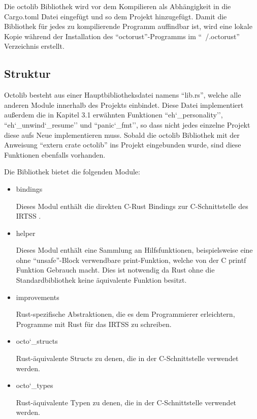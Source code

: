 Die octolib Bibliothek wird vor dem Kompilieren als Abhängigkeit in die Cargo.toml Datei eingefügt und so dem Projekt hinzugefügt.
Damit die Bibliothek für jedes zu kompilierende Programm auffindbar ist, wird eine lokale Kopie während der Installation des
``octorust''-Programms im ``~/.octorust'' Verzeichnis erstellt.

\subsection{Struktur}

Octolib besteht aus einer Hauptbibliotheksdatei namens ``lib.rs'', welche alle anderen Module innerhalb des Projekts einbindet. Diese
Datei implementiert außerdem die in Kapitel 3.1 erwähnten Funktionen ``eh\char`_personality'', ``eh\char`_unwind\char`_resume'' und
``panic\char`_fmt'', so dass nicht jedes einzelne Projekt diese aufs Neue implementieren muss. Sobald die octolib Bibliothek
mit der Anweisung ``extern crate octolib'' ins Projekt eingebunden wurde, sind diese Funktionen ebenfalls vorhanden.

Die Bibliothek bietet die folgenden Module:

\begin{itemize}

	\item{bindings}
	
	Dieses Modul enthält die direkten C-Rust Bindings zur C-Schnittstelle des IRTSS	.
	
	\item{helper}
	
	Dieses Modul enthält eine Sammlung an Hilfsfunktionen, beispielsweise eine ohne ``unsafe''-Block verwendbare
	print-Funktion, welche von der C printf Funktion Gebrauch macht. Dies ist notwendig da Rust ohne die Standardbibliothek
	keine äquivalente Funktion besitzt.
	
	\item{improvements}
	
	Rust-spezifische Abstraktionen, die es dem Programmierer erleichtern, Programme mit Rust für das IRTSS zu schreiben.
	
	\item{octo\char`_structs}
	
	Rust-äquivalente Structs zu denen, die in der C-Schnittstelle verwendet werden.
	
	\item{octo\char`_types}
	
	Rust-äquivalente Typen zu denen, die in der C-Schnittstelle verwendet werden.

\end{itemize}

